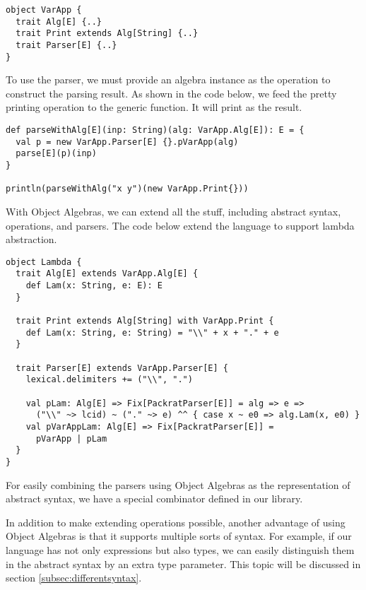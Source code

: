 \begin{lstlisting}
object VarApp {
  trait Alg[E] {..}
  trait Print extends Alg[String] {..}
  trait Parser[E] {..}
}
\end{lstlisting}

To use the parser, we must provide an algebra instance as the operation to construct the parsing result. As shown in the code below, we feed the pretty printing operation  to the generic  function. It will print  as the result.

\begin{lstlisting}
def parseWithAlg[E](inp: String)(alg: VarApp.Alg[E]): E = {
  val p = new VarApp.Parser[E] {}.pVarApp(alg)
  parse[E](p)(inp)
}

println(parseWithAlg("x y")(new VarApp.Print{}))
\end{lstlisting}

With Object Algebras, we can extend all the stuff, including abstract syntax, operations, and parsers. The code below extend the language to support lambda abstraction.

\begin{lstlisting}
object Lambda {
  trait Alg[E] extends VarApp.Alg[E] {
    def Lam(x: String, e: E): E
  }

  trait Print extends Alg[String] with VarApp.Print {
    def Lam(x: String, e: String) = "\\" + x + "." + e
  }

  trait Parser[E] extends VarApp.Parser[E] {
    lexical.delimiters += ("\\", ".")

    val pLam: Alg[E] => Fix[PackratParser[E]] = alg => e =>
      ("\\" ~> lcid) ~ ("." ~> e) ^^ { case x ~ e0 => alg.Lam(x, e0) }
    val pVarAppLam: Alg[E] => Fix[PackratParser[E]] =
      pVarApp | pLam
  }
}
\end{lstlisting}

For easily combining the parsers using Object Algebras as the representation of abstract syntax, we have a special combinator  defined in our library.

In addition to make extending operations possible, another advantage of using Object Algebras is that it supports multiple sorts of syntax. For example, if our language has not only expressions but also types, we can easily distinguish them in the abstract syntax by an extra type parameter. This topic will be discussed in section \ref{subsec:differentsyntax}.

